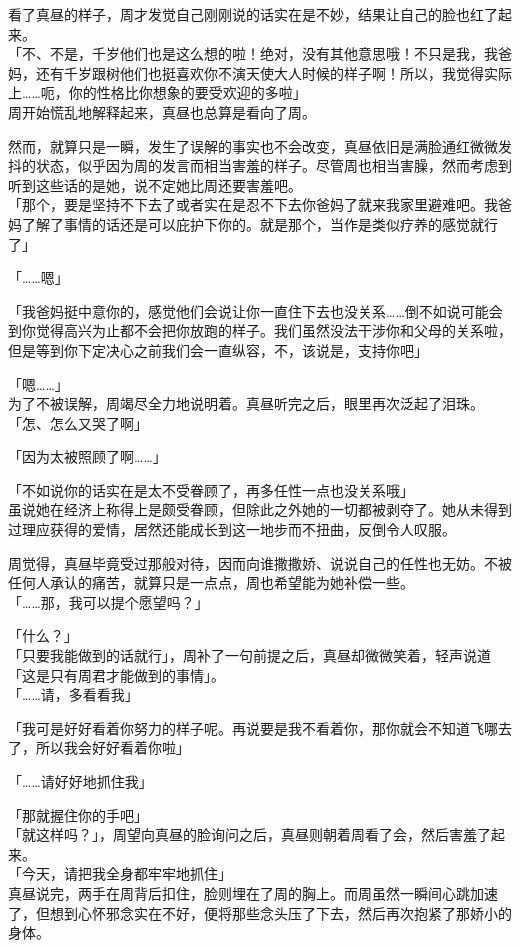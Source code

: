 看了真昼的样子，周才发觉自己刚刚说的话实在是不妙，结果让自己的脸也红了起来。\\

「不、不是，千岁他们也是这么想的啦！绝对，没有其他意思哦！不只是我，我爸妈，还有千岁跟树他们也挺喜欢你不演天使大人时候的样子啊！所以，我觉得实际上……呃，你的性格比你想象的要受欢迎的多啦」\\

周开始慌乱地解释起来，真昼也总算是看向了周。

然而，就算只是一瞬，发生了误解的事实也不会改变，真昼依旧是满脸通红微微发抖的状态，似乎因为周的发言而相当害羞的样子。尽管周也相当害臊，然而考虑到听到这些话的是她，说不定她比周还要害羞吧。\\

「那个，要是坚持不下去了或者实在是忍不下去你爸妈了就来我家里避难吧。我爸妈了解了事情的话还是可以庇护下你的。就是那个，当作是类似疗养的感觉就行了」

「……嗯」

「我爸妈挺中意你的，感觉他们会说让你一直住下去也没关系……倒不如说可能会到你觉得高兴为止都不会把你放跑的样子。我们虽然没法干涉你和父母的关系啦，但是等到你下定决心之前我们会一直纵容，不，该说是，支持你吧」

「嗯……」\\

为了不被误解，周竭尽全力地说明着。真昼听完之后，眼里再次泛起了泪珠。\\

「怎、怎么又哭了啊」

「因为太被照顾了啊……」

「不如说你的话实在是太不受眷顾了，再多任性一点也没关系哦」\\

虽说她在经济上称得上是颇受眷顾，但除此之外她的一切都被剥夺了。她从未得到过理应获得的爱情，居然还能成长到这一地步而不扭曲，反倒令人叹服。

周觉得，真昼毕竟受过那般对待，因而向谁撒撒娇、说说自己的任性也无妨。不被任何人承认的痛苦，就算只是一点点，周也希望能为她补偿一些。\\

「……那，我可以提个愿望吗？」

「什么？」\\

「只要我能做到的话就行」，周补了一句前提之后，真昼却微微笑着，轻声说道「这是只有周君才能做到的事情」。\\

「……请，多看看我」

「我可是好好看着你努力的样子呢。再说要是我不看着你，那你就会不知道飞哪去了，所以我会好好看着你啦」

「……请好好地抓住我」

「那就握住你的手吧」\\

「就这样吗？」，周望向真昼的脸询问之后，真昼则朝着周看了会，然后害羞了起来。\\

「今天，请把我全身都牢牢地抓住」\\

真昼说完，两手在周背后扣住，脸则埋在了周的胸上。而周虽然一瞬间心跳加速了，但想到心怀邪念实在不好，便将那些念头压了下去，然后再次抱紧了那娇小的身体。
